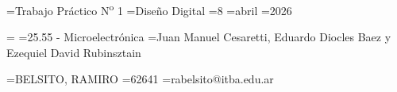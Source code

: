 \def\declvar #1#2{%
   \ifx#1\undefined
       \newtoks#1%
   \fi
   #1={#2}}%

\declvar\titulo {Trabajo Práctico N\textsuperscript{o} 1}
\declvar\nombreTP {Diseño Digital}
\declvar\dia {8}
\declvar\mes {abril}
\declvar\ano {2026}

\declvar\grupo {}
\declvar\materia {25.55 - Microelectrónica}
\declvar\profesores {Juan Manuel Cesaretti, Eduardo Diocles Baez y Ezequiel David Rubinsztain}

\declvar\nomEstudianteA {BELSITO, RAMIRO}
\declvar\legajoEstudianteA {62641}
\declvar\mailEstudianteA {rabelsito@itba.edu.ar}